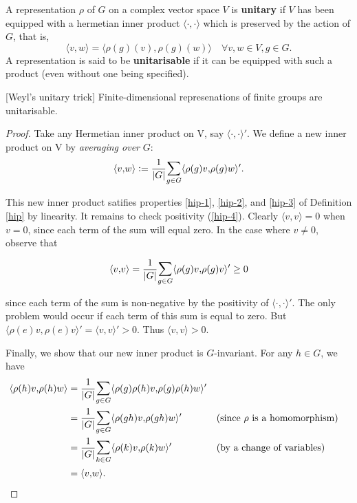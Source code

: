 \begin{defn}
A representation $\rho$ of $G$ on a complex vector space $V$ is \textbf{unitary} if $V$ has been equipped with a hermetian inner product $\langle \cdot{,}\cdot \rangle$ which is preserved by the action of $G$, that is, 
\[ \langle v , w \rangle = \langle \rho(g)(v) , \rho(g)(w) \rangle \quad \forall v,w \in V, g \in G. \]
A representation is said to be \textbf{unitarisable} if it can be equipped with such a product (even without one being specified).
\end{defn}

\begin{thm}\label{weyl-unitary-trick} [Weyl's unitary trick] Finite-dimensional represenations of finite groups are unitarisable.
\end {thm}
\begin{proof}
Take any Hermetian inner product on V, say $\langle \cdot{,}\cdot \rangle'$.  We define a new inner product on V by \textit{averaging over} $G$:
\[ \langle v {,}w  \rangle \defeq \frac{1}{|G|} \mathlarger{\sum}_{g \in G} \langle \rho(g)v {,} \rho(g)w \rangle'. \]

This new inner product satifies properties \ref{hip-1},  \ref{hip-2}, and  \ref{hip-3} of Definition \ref{hip} by linearity.  It remains to check positivity (\ref{hip-4}).  Clearly $\langle v {,} v \rangle = 0$ when $v =0$, since each term of the sum will equal zero.  In the case where $v \neq 0$,  observe that

\[ \langle v {,} v \rangle =\frac{1}{|G|} \mathlarger{\sum}_{g \in G} \langle \rho(g)v {,} \rho(g)v \rangle' \geq 0\]

since each term of the sum is non-negative by the positivity of $\langle \cdot{,}\cdot \rangle'$.  The only problem would occur if each term of this sum is equal to zero.  But $\langle \rho(e) v {,} \rho(e) v \rangle ' = \langle v {,} v\rangle' > 0$.  Thus $\langle v {,} v \rangle > 0$.  

Finally, we show that our new inner product is $G$-invariant.  For any $h \in G$, we have
\begin{align*}
\langle \rho(h) v {,} \rho(h) w  \rangle &= \frac{1}{|G|} \mathlarger{\sum}_{g \in G} \langle \rho(g) \rho(h)v {,}\rho(g) \rho(h)w \rangle' \\
&= \frac{1}{|G|} \mathlarger{\sum}_{g \in G} \langle \rho(gh)v {,} \rho(gh)w \rangle' && \text{(since $\rho$ is a homomorphism)} \\
&= \frac{1}{|G|} \mathlarger{\sum}_{k \in G} \langle \rho(k)v {,} \rho(k)w \rangle' && \text{(by a change of variables)}\\
&= \langle v {,} w \rangle.
\end{align*}
\end{proof}

